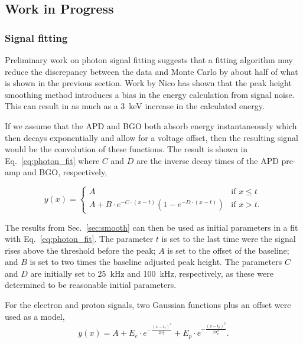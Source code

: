 \documentclass[oneside,12pt]{memoir}
\begin{document}
\subsection{Work in Progress}
\label{sec:work_progress}

\subsubsection{Signal fitting}
\label{sec:photon_fit}

Preliminary work on photon signal fitting suggests that a fitting algorithm may reduce the discrepancy between the data and Monte Carlo by about half of what is shown in the previous section. Work by Nico has shown that the peak height smoothing method introduces a bias in the energy calculation from signal noise. This can result in as much as a 3~keV increase in the calculated energy.\par
If we assume that the APD and BGO both absorb energy instantaneously which then decays exponentially and allow for a voltage offset, then the resulting signal would be the convolution of these functions. The result is shown in Eq.~\ref{eq:photon_fit} where $C$ and $D$ are the inverse decay times of the APD pre-amp and BGO, respectively,\par
\begin{equation}
\label{eq:photon_fit}
	y\left(x\right)=
		\begin{cases}
			A & \text{if } x \leq t \\
			A+B\cdot e^{-C\cdot\left(x-t\right)}
				\left(1-e^{-D\cdot\left(x-t\right)}\right) & 
				\text{if } x > t.
		\end{cases}
\end{equation}\par
The results from Sec.~\ref{sec:smooth} can then be used as initial parameters in a fit with Eq.~\ref{eq:photon_fit}. The parameter $t$ is set to the last time were the signal rises above the threshold before the peak; $A$ is set to the offset of the baseline; and $B$ is set to two times the baseline adjusted peak height. The parameters $C$ and $D$ are initially set to 25~kHz and 100~kHz, respectively, as these were determined to be reasonable initial parameters.\par
For the electron and proton signals, two Gaussian functions plus an offset were used as a model,
\begin{equation}
\label{eq:ep_signal}
	y\left(x\right)=
		A+E_e\cdot e^{-\frac{\left(x-t_e\right)^2}{2\sigma_e^2}}
		+E_p\cdot e^{-\frac{\left(x-t_p\right)^2}{2\sigma_p^2}}.
\end{equation}
\end{document}
